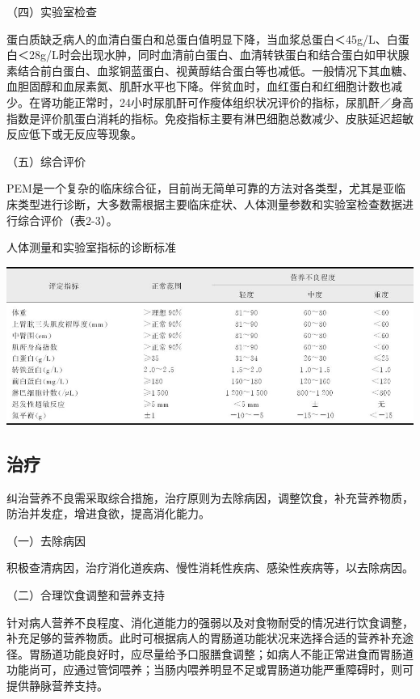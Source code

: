 （四）实验室检查

蛋白质缺乏病人的血清白蛋白和总蛋白值明显下降，当血浆总蛋白＜45g/L、白蛋白＜28g/L时会出现水肿，同时血清前白蛋白、血清转铁蛋白和结合蛋白如甲状腺素结合前白蛋白、血浆铜蓝蛋白、视黄醇结合蛋白等也减低。一般情况下其血糖、血胆固醇和血尿素氮、肌酐水平也下降。伴贫血时，血红蛋白和红细胞计数也减少。在肾功能正常时，24小时尿肌酐可作瘦体组织状况评价的指标，尿肌酐／身高指数是评价肌蛋白消耗的指标。免疫指标主要有淋巴细胞总数减少、皮肤延迟超敏反应低下或无反应等现象。

（五）综合评价

PEM是一个复杂的临床综合征，目前尚无简单可靠的方法对各类型，尤其是亚临床类型进行诊断，大多数需根据主要临床症状、人体测量参数和实验室检查数据进行综合评价（表2-3）。

\begin{table}[htbp]
\centering
\caption{人体测量和实验室指标的诊断标准}
\label{tab2-3}
\includegraphics{./images/Image00008.jpg}
\end{table}

\hypertarget{text00003.htmlux5cux23mllj14}{%
\subsection{治疗}\label{text00003.htmlux5cux23mllj14}}

纠治营养不良需采取综合措施，治疗原则为去除病因，调整饮食，补充营养物质，防治并发症，增进食欲，提高消化能力。

（一）去除病因

积极查清病因，治疗消化道疾病、慢性消耗性疾病、感染性疾病等，以去除病因。

（二）合理饮食调整和营养支持

针对病人营养不良程度、消化道能力的强弱以及对食物耐受的情况进行饮食调整，补充足够的营养物质。此时可根据病人的胃肠道功能状况来选择合适的营养补充途径。胃肠道功能良好时，应尽量给予口服膳食调整；如病人不能正常进食而胃肠道功能尚可，应通过管饲喂养；当肠内喂养明显不足或胃肠道功能严重障碍时，则可提供静脉营养支持。

